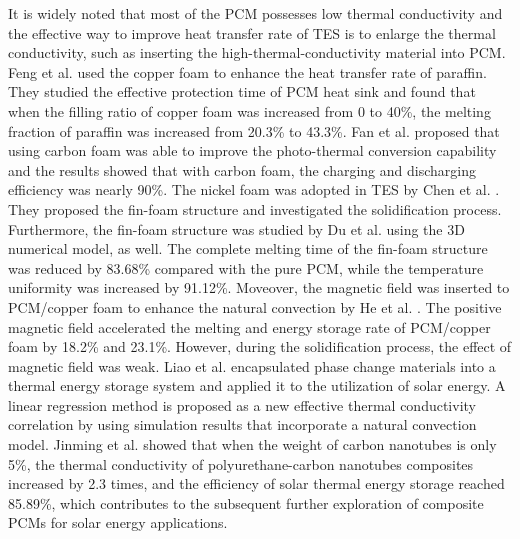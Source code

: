 \documentclass[preprint,12pt]{elsarticle}
\begin{document}
It is widely noted that most of the PCM possesses low thermal conductivity and the effective way to improve heat transfer rate of TES is to enlarge the thermal conductivity, such as inserting the high-thermal-conductivity material into PCM. Feng et al. \cite{RN1215} used the copper foam to enhance the heat transfer rate of paraffin. They studied the effective protection time of PCM heat sink and found that when the filling ratio of copper foam was increased from 0 to 40\%, the melting fraction of paraffin was increased from 20.3\% to 43.3\%. Fan et al. \cite{RN1218} proposed that using carbon foam was able to improve the photo-thermal conversion capability and the results showed that with carbon foam, the charging and discharging efficiency was nearly 90\%. The nickel foam was adopted in TES by Chen et al. \cite{RN1219}. They proposed the fin-foam structure and investigated the solidification process. Furthermore, the fin-foam structure was studied by Du et al. \cite{RN1223} using the 3D numerical model, as well. The complete melting time of the fin-foam structure was reduced by 83.68\% compared with the pure PCM, while the temperature uniformity was increased by 91.12\%. Moveover, the magnetic field was inserted to PCM/copper foam to enhance the natural convection by He et al. \cite{RN1220}. The positive magnetic field accelerated the melting and energy storage rate of PCM/copper foam by 18.2\% and 23.1\%. However, during the solidification process, the effect of magnetic field was weak.
Liao et al. \cite{Liao2018ANE} encapsulated phase change materials into a thermal energy storage system and applied it to the utilization of solar energy. A linear regression method is proposed as a new effective thermal conductivity correlation by using simulation results that incorporate a natural convection model.
Jinming et al. \cite{Shi2020TuningTF} showed that when the weight of carbon nanotubes is only 5\%, the thermal conductivity of polyurethane-carbon nanotubes composites increased by 2.3 times, and the efficiency of solar thermal energy storage reached 85.89\%, which contributes to the subsequent further exploration of composite PCMs for solar energy applications.
\end{document}
